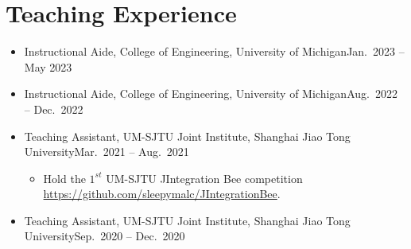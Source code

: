 \documentclass[letterpaper,10.8pt]{article}
\begin{document}
\section{Teaching Experience}
\begin{itemize}
  \item {}
        {Instructional Aide, College of Engineering, University of Michigan}{Jan.\ 2023 -- May 2023}

  \item {}
        {Instructional Aide, College of Engineering, University of Michigan}{Aug.\ 2022 -- Dec.\ 2022}

  \item {}
        {Teaching Assistant, UM-SJTU Joint Institute, Shanghai Jiao Tong University}{Mar.\ 2021 -- Aug.\ 2021}
        \begin{itemize}
          \item {}
                {Hold the \(1^{st}\) UM-SJTU JIntegration Bee competition \url{https://github.com/sleepymalc/JIntegrationBee}.}
        \end{itemize}

  \item {}
        {Teaching Assistant, UM-SJTU Joint Institute, Shanghai Jiao Tong University}{Sep.\ 2020 -- Dec.\ 2020}
\end{itemize}

\end{document}
